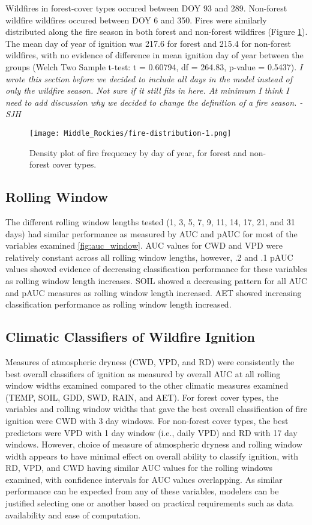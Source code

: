 \documentclass[11pt]{article}
\begin{document}
Wildfires in forest-cover types occured between DOY 93 and 289.  Non-forest wildfire wildfires occured between DOY 6 and 350.  Fires were similarly distributed along the fire season in both forest and non-forest wildfires (Figure \ref{fig:fire-dens}). The mean day of year of ignition was 217.6 for forest and 215.4 for non-forest wildfires, with no evidence of difference in mean ignition day of year between the groups (Welch Two Sample t-test: t = 0.60794, df = 264.83, p-value = 0.5437). \textit{I wrote this section before we decided to include all days in the model instead of only the wildfire season.  Not sure if it still fits in here.  At minimum I think I need to add discussion why we decided to change the definition of a fire season. -SJH}

\begin{figure}[ht]
  \texttt{[image: Middle\_Rockies/fire-distribution-1.png]}
  \caption{Density plot of fire frequency by day of year, for forest and non-forest cover types.}
  \label{fig:fire-dens}
\end{figure}


\subsection{Rolling Window}
The different rolling window lengths tested (1, 3, 5, 7, 9, 11, 14, 17, 21,  and 31 days) had similar performance as measured by AUC and pAUC for most of the variables examined \ref{fig:auc_window}. AUC values for CWD and VPD were relatively constant across all rolling window lengths, however, .2 and .1 pAUC values showed evidence of decreasing classification performance for these variables as rolling window length increases.  SOIL showed a decreasing pattern for all AUC and pAUC measures as rolling window length increased.  AET showed increasing classification performance as rolling window length increased.  

\subsection{Climatic Classifiers of Wildfire Ignition}

Measures of atmospheric dryness (CWD, VPD, and RD) were consistently the best overall classifiers of ignition as measured by overall AUC at all rolling window widths examined compared to the other climatic measures examined (TEMP, SOIL, GDD, SWD, RAIN, and AET).  For forest cover types, the variables and rolling window widths that gave the best overall classification of fire ignition were CWD with 3 day windows.  For non-forest cover types, the best predictors were VPD with 1 day window (i.e., daily VPD) and RD with 17 day windows.  However, choice of measure of atmospheric dryness and rolling window width appears to have minimal effect on overall ability to classify ignition, with RD, VPD, and CWD having similar AUC values for the rolling windows examined, with confidence intervals for AUC values overlapping.  As similar performance can be expected from any of these variables, modelers can be justified selecting one or another based on practical requirements such as data availability and ease of computation.
\end{document}
